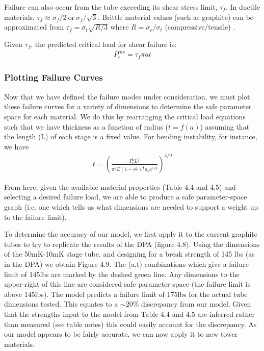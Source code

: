 \documentclass{report}
\begin{document}
Failure can also occur from the tube exceeding its shear stress limit, $\tau_{f}$. In ductile materials, $\tau_{f} \approx \sigma_{f}/2 \ \text{or} \ \sigma_{f}/\sqrt{3}$. Brittle material values (such as graphite) can be approximated from $\tau_{f} = \sigma_{t}\sqrt{R/3} $ where $R = \sigma_{c}/\sigma_{t}$ (compressive/tensile) \cite{Ely1965}.

Given $\tau_{f}$, the predicted critical load for shear failure is:
\begin{eqnarray}
P_{c}^{ms} = \tau_{f}\pi at
\end{eqnarray}

\subsubsection{Plotting Failure Curves}

Now that we have defined the failure modes under consideration, we must plot these failure curves for a variety of dimensions to determine the safe parameter space for each material. We do this by rearranging the critical load equations such that we have thickness as a function of radius ($t = f(a)$) assuming that the length (L) of each stage is a fixed value. For bending instability, for instance, we have
\begin{eqnarray}
t = \left(\frac{P_{c}^b L^\frac{1}{2}}{\pi^3 E (1-\nu^2)^\frac{5}{8}a_s a^{1/4}}\right)^{4/9}
\end{eqnarray}

From here, given the available material properties (Table 4.4 and 4.5) and selecting a desired failure load, we are able to produce a safe parameter-space graph (i.e. one which tells us what dimensions are needed to support a weight up to the failure limit).

To determine the accuracy of our model, we first apply it to the current graphite tubes to try to replicate the results of the DPA (figure 4.8). Using the dimensions of the 50mK-10mK stage tube, and designing for a break strength of 145 lbs (as in the DPA) we obtain Figure 4.9.  The (a,t) combinations which give a failure limit of 145lbs are marked by the dashed green line. Any dimensions to the upper-right of this line are considered safe parameter space (the failure limit is above 145lbs). The model predicts a failure limit of 175lbs for the actual tube dimensions tested. This equates to a $\sim$20\% discrepancy from our model. Given that the strengths input to the model from Table 4.4 and 4.5 are inferred rather than measured (see table notes) this could easily account for the discrepancy. As our model appears to be fairly accurate, we can now apply it to new tower materials.
\end{document}
